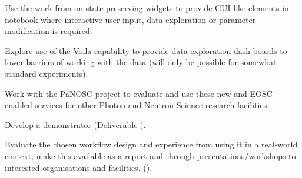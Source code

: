 \begin{task}[
  title=Demonstrator: Reproducible photon science workflows at European XFEL,
  id=reproducibility-xfel,
  lead=XFEL,
  PM=35,
  wphases={6-48},
  partners={EGI,INSERM,SRL,UPSUD}
  ]
\begin{compactitem}
  \item Use the work from  on
    state-preserving widgets to provide GUI-like elements in notebook
    where interactive user input, data exploration or parameter
    modification is required.

  \item Explore use of the Voila capability to provide
    data exploration dash-boards to lower barriers of working with the
    data (will only be possible for somewhat standard experiments).

  \item Work with the PaNOSC project \cite{panosc} to evaluate and use
    these new and EOSC-enabled services for other Photon and Neutron
    Science research facilities.
  \item Develop a demonstrator (Deliverable ).

  \item Evaluate the chosen workflow design and experience from using
    it in a real-world context; make this available as a report and
    through presentations/workshops to interested organisations and
    facilities. ().




  \end{compactitem}

 \end{task}
